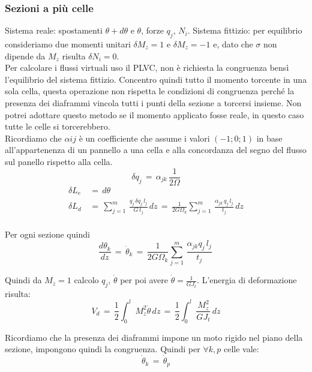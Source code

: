 \subsubsection*{ Sezioni a più celle}

Sistema reale: spostamenti $\theta + d\theta$ e $\theta$, forze $q_j$, $N_i$. Sistema fittizio: per equilibrio consideriamo due momenti unitari $\delta M_z =1$ e $\delta M_z =-1$ e, dato che $\sigma$ non dipende da $M_z$ risulta  $\delta N_i=0$. \\
Per calcolare i flussi virtuali uso il PLVC, non è richiesta la congruenza bensì l'equilibrio del sistema fittizio. Concentro quindi tutto il momento torcente in una sola cella, questa operazione non rispetta le condizioni di congruenza perché la presenza dei diaframmi vincola tutti i punti della sezione a torcersi insieme. Non potrei adottare questo metodo se il momento applicato fosse reale, in questo caso tutte le celle si torcerebbero.\\
Ricordiamo che $\alpha{ij}$ è un coefficiente che assume i valori $(-1;0;1)$ in base all'appartenenza di un pannello a una cella e alla concordanza del segno del flusso sul panello rispetto alla cella.
\begin{equation*}
    \delta q_j\,=\,\alpha_{jk}\,\frac{1}{2\Omega}
\end{equation*}
\begin{align*}
     \delta L_e \,&=\, d\theta\\
     \delta L_d\,&=\, \sum^m_{j=1}\,\frac{q_j\,\delta q_j\,l_j}{G\,t_j}\,dz
    \,=\, \frac{1}{2G\Omega_k}\sum^m_{j=1}\,\frac{\alpha_{jk}\,q_j\,l_j}{t_j}\,dz\\
\end{align*}

Per ogni sezione quindi
\begin{equation*}
   \frac{d\theta_k}{dz} \,=\, \dot{\theta}_k \,=\,\frac{1}{2G\Omega_k}\sum^m_{j=1}\,\frac{\alpha_{jk}q_j\,l_j}{t_j}\,
\end{equation*}

Quindi da $M_z=1$ calcolo $q_j$, $\dot{\theta}$ per poi avere $\dot{\theta}=\frac{1}{GJ_t}$. L'energia di deformazione risulta:
\begin{equation*}
    V_d\,=\,\frac{1}{2}\int_0^l \, M_z^2\dot{\theta}\,dz \,=\,\frac{1}{2}\int_0^l \, \frac{M_z^2}{GJ_t}\,dz
\end{equation*}

Ricordiamo che la presenza dei diaframmi impone un moto rigido nel piano della sezione, impongono quindi la congruenza. Quindi per $\forall k,p$ celle vale:
\begin{equation*}
    \dot{\theta}_k\,=\,\dot{\theta}_p
\end{equation*}




